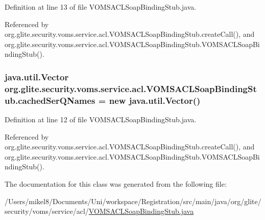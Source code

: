 Definition at line 13 of file VOMSACLSoapBindingStub.java.



Referenced by org.glite.security.voms.service.acl.VOMSACLSoapBindingStub.createCall(), and org.glite.security.voms.service.acl.VOMSACLSoapBindingStub.VOMSACLSoapBindingStub().

\hypertarget{classorg_1_1glite_1_1security_1_1voms_1_1service_1_1acl_1_1VOMSACLSoapBindingStub_a9a88669798594a57c1984913ab629a8b}{
\subsubsection[{cachedSerQNames}]{\setlength{\rightskip}{0pt plus 5cm}java.util.Vector {\bf org.glite.security.voms.service.acl.VOMSACLSoapBindingStub.cachedSerQNames} = new java.util.Vector()}}
\label{classorg_1_1glite_1_1security_1_1voms_1_1service_1_1acl_1_1VOMSACLSoapBindingStub_a9a88669798594a57c1984913ab629a8b}


Definition at line 12 of file VOMSACLSoapBindingStub.java.



Referenced by org.glite.security.voms.service.acl.VOMSACLSoapBindingStub.createCall(), and org.glite.security.voms.service.acl.VOMSACLSoapBindingStub.VOMSACLSoapBindingStub().



The documentation for this class was generated from the following file:\begin{DoxyCompactItemize}
\item 
/Users/mikel8/Documents/Uni/workspace/Registration/src/main/java/org/glite/security/voms/service/acl/\hyperlink{VOMSACLSoapBindingStub_8java}{VOMSACLSoapBindingStub.java}\end{DoxyCompactItemize}
